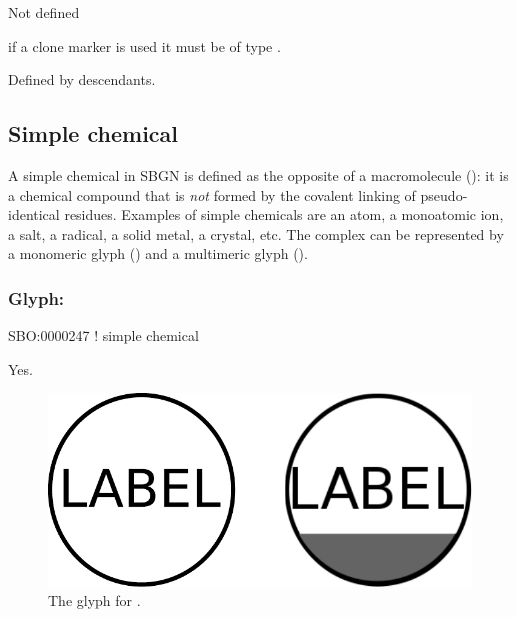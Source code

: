 \begin{glyphDescription}
\glyphSboTerm Not defined
\glyphAux
\glyphRules%
\begin{inparaenum}
\item if a clone marker is used it must be of type .
\end{inparaenum}
\glyphCloning Defined by descendants.
\end{glyphDescription}

\subsection{Simple chemical}
\label{sec:simpleChemical}

A simple chemical in SBGN is defined as the opposite of a
macromolecule (): it is a chemical compound that
is \emph{not} formed by the covalent linking of pseudo-identical
residues.  Examples of simple chemicals are an atom, a monoatomic ion,
a salt, a radical, a solid metal, a crystal, etc. The complex can be
represented by a monomeric glyph () and a multimeric
glyph ().

\subsubsection{Glyph: }

\begin{glyphDescription}
\glyphSboTerm SBO:0000247 ! simple chemical
\glyphAux 
\glyphRules%
\begin{inparaenum}
\end{inparaenum}
\glyphCloning Yes.
\end{glyphDescription}

\begin{figure}[htb]
  \centering
  \includegraphics[scale = 0.3]{images/simpleChemical}
  \caption{The \PD glyph for .}
  \label{fig:simpleChemical}
\end{figure}

